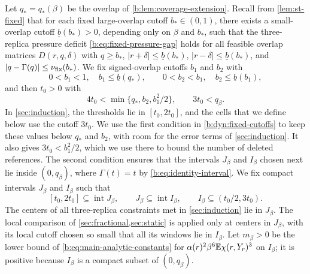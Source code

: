 Let $q_*=q_*(\beta)$ be the overlap of \cref{b:lem:coverage-extension}.
Recall from \cref{lem:st-fixed} that for each fixed large-overlap cutoff
$b_*\in(0,1)$, there exists a small-overlap cutoff $\underline b(b_*)>0$, depending only
on $\beta$ and $b_*$, such that the three-replica pressure deficit
\eqref{b:eq:fixed-pressure-gap} holds for all feasible overlap matrices
$D(r,q,\delta)$ with $q\ge b_*$, $|r+\delta|\le\underline b(b_*)$,
$|r-\delta|\le\underline b(b_*)$, and $|q-\Gamma(q)|\le\nu_{\rm fix}(b_*)$. We fix signed-overlap cutoffs
$b_1$ and $b_2$ with
\[
 0<b_1<1,\quad b_1\le\underline b(q_*),\qquad
 0<b_2<b_1,\quad b_2\le\underline b(b_1),
\]
and then $t_0>0$ with
\begin{equation}\label{b:dyn:fixed-cutoffs}
 4t_0<\min\{q_*,b_2,b_1^2/2\},\qquad 3t_0<q_\beta .
\end{equation}
In \cref{sec:induction}, the thresholds lie in $[t_0,2t_0]$, and the cells
that we define below use the cutoff $3t_0$. We use the first condition in
\eqref{b:dyn:fixed-cutoffs} to keep these values below $q_*$ and $b_2$, with
room for the error terms of \cref{sec:induction}. It also gives
$3t_0<b_1^2/2$, which we use there to bound the number of deleted
references. The second condition ensures that the intervals $J_\beta$ and
$I_\beta$ chosen next lie inside $(0,q_\beta)$, where $\Gamma(t)=t$ by
\eqref{b:eq:identity-interval}. We fix compact intervals $J_\beta$ and
$I_\beta$ such that
\begin{equation}\label{eq:ref-intervals}
 [t_0,2t_0]\subseteq\operatorname{int}J_\beta,\qquad
 J_\beta\subseteq\operatorname{int}I_\beta,\qquad
 I_\beta\subseteq(t_0/2,3t_0).
\end{equation}
The centers of all three-replica constraints met in \cref{sec:induction}
lie in $J_\beta$. The local comparison of
\cref{sec:fractional,sec:static} is applied only at centers in $J_\beta$,
with its local cutoff chosen so small that all its windows lie in
$I_\beta$. Let $m_\beta>0$ be the lower
bound of \eqref{b:eq:main-analytic-constants} for
$\alpha(r)^2\beta^6\mathbb E\chi(r,Y_r)^3$ on $I_\beta$; it is positive because
$I_\beta$ is a compact subset of $(0,q_\beta)$.

